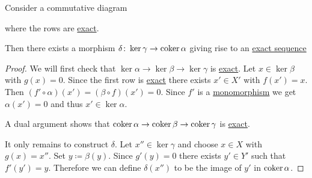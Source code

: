 \documentclass[../../main]{subfiles}
\begin{document}
\begin{lemma}\label{lemma:snake-lemma}
  Consider a commutative diagram
  \begin{center}
  \end{center}
  where the rows are \hyperref[def:exact-sequence]{exact}.

  Then there exists a morphism \(\delta\colon \ker \gamma \to \operatorname*{coker} \alpha\) giving rise to an \hyperref[def:exact-sequence]{exact sequence}
  \begin{center}
  \end{center}
\end{lemma}
\begin{proof}
  We will first check that \(\ker \alpha \to \ker \beta \to \ker \gamma\) is \hyperref[def:exact-sequence]{exact}.
  Let \(x \in \ker \beta\) with \(g(x) = 0\).
  Since the first row is \hyperref[def:exact-sequence]{exact} there exists \(x' \in X'\) with \(f(x') = x\).
  Then \((f' \circ \alpha)(x') = (\beta \circ f)(x') = 0\).
  Since \(f'\) is a \hyperref[def:mono-epi-morphism]{monomorphism} we get \(\alpha(x') = 0\) and thus \(x' \in \ker \alpha\).

  A dual argument shows that \(\operatorname*{coker} \alpha \to \operatorname*{coker} \beta \to \operatorname*{coker} \gamma\) is \hyperref[def:exact-sequence]{exact}.

  It only remains to construct \(\delta\).
  Let \(x'' \in \ker \gamma\) and choose \(x \in X\) with \(g(x) = x''\).
  Set \(y \coloneq \beta(y)\).
  Since \(g'(y) = 0\) there exists \(y' \in Y'\) such that \(f'(y') = y\).
  Therefore we can define \(\delta(x'')\) to be the image of \(y'\) in \(\operatorname*{coker} \alpha\).
\end{proof}
\end{document}
